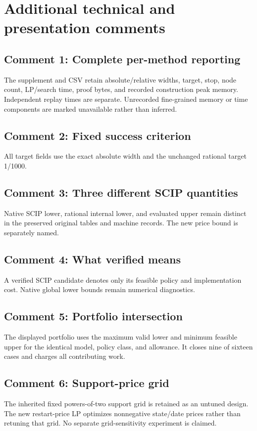 \section{Additional technical and presentation comments}
\subsection{Comment 1: Complete per-method reporting}
The supplement and CSV retain absolute/relative widths, target, stop, node count, LP/search time, proof bytes, and recorded construction peak memory. Independent replay times are separate. Unrecorded fine-grained memory or time components are marked unavailable rather than inferred.

\subsection{Comment 2: Fixed success criterion}
All target fields use the exact absolute width and the unchanged rational target 1/1000.

\subsection{Comment 3: Three different SCIP quantities}
Native SCIP lower, rational internal lower, and evaluated upper remain distinct in the preserved original tables and machine records. The new price bound is separately named.

\subsection{Comment 4: What verified means}
A verified SCIP candidate denotes only its feasible policy and implementation cost. Native global lower bounds remain numerical diagnostics.

\subsection{Comment 5: Portfolio intersection}
The displayed portfolio uses the maximum valid lower and minimum feasible upper for the identical model, policy class, and allowance. It closes nine of sixteen cases and charges all contributing work.

\subsection{Comment 6: Support-price grid}
The inherited fixed powers-of-two support grid is retained as an untuned design. The new restart-price LP optimizes nonnegative state/date prices rather than retuning that grid. No separate grid-sensitivity experiment is claimed.

